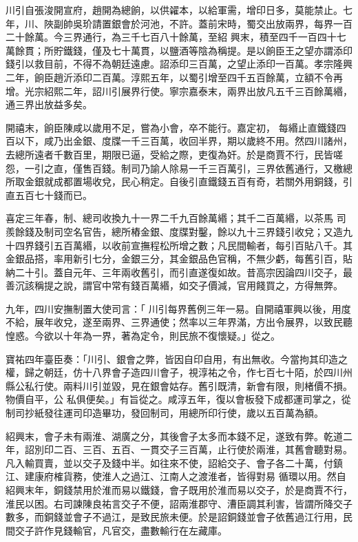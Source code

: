 \begin{pinyinscope}
 川引自張浚開宣府，趙開為總餉，以供糴本，以給軍需，增印日多，莫能禁止。七年，川、陜副帥吳玠請置銀會於河池，不許。蓋前宋時，蜀交出放兩界，每界一百二十餘萬。今三界通行，為三千七百八十餘萬，至紹
 興末，積至四千一百四十七萬餘貫；所貯鐵錢，僅及七十萬貫，以鹽酒等陰為稱提。是以餉臣王之望亦謂添印錢引以救目前，不得不為朝廷遠慮。詔添印三百萬，之望止添印一百萬。孝宗隆興二年，餉臣趙沂添印二百萬。淳熙五年，以蜀引增至四千五百餘萬，立額不令再增。光宗紹熙二年，詔川引展界行使。寧宗嘉泰末，兩界出放凡五千三百餘萬緡，通三界出放益多矣。



 開禧末，餉臣陳咸以歲用不足，嘗為小會，卒不能行。嘉定初，
 每緡止直鐵錢四百以下，咸乃出金銀、度牒一千三百萬，收回半界，期以歲終不用。然四川諸州，去總所遠者千數百里，期限已逼，受給之際，吏復為奸。於是商賈不行，民皆嗟怨，一引之直，僅售百錢。制司乃諭人除易一千三百萬引，三界依舊通行，又檄總所取金銀就成都置場收兌，民心稍定。自後引直鐵錢五百有奇，若關外用銅錢，引直五百七十錢而已。



 喜定三年春，制、總司收換九十一界二千九百餘萬緡；其千二百萬緡，以茶馬
 司羨餘錢及制司空名官告，總所樁金銀、度牒對鑿，餘以九十三界錢引收兌；又造九十四界錢引五百萬緡，以收前宣撫程松所增之數；凡民間輸者，每引百貼八千。其金銀品搭，率用新引七分，金銀三分，其金銀品色官稱，不無少虧，每舊引百，貼納二十引。蓋自元年、三年兩收舊引，而引直遂復如故。昔高宗因論四川交子，最善沉該稱提之說，謂官中常有錢百萬緡，如交子價減，官用餞買之，方得無弊。



 九年，四川安撫制置大使司言：「
 川引每界舊例三年一易。自開禧軍興以後，用度不給，展年收兌，遂至兩界、三界通使；然率以三年界滿，方出令展界，以致民聽惶惑。今欲以十年為一界，著為定令，則民旅不復懷疑。」從之。



 寶祐四年臺臣奏：「川引、銀會之弊，皆因自印自用，有出無收。今當拘其印造之權，歸之朝廷，仿十八界會子造四川會子，視淳祐之令，作七百七十陌，於四川州縣公私行使。兩料川引並毀，見在銀會姑存。舊引既清，新會有限，則楮價不損。物價自平，公
 私俱便矣。」有旨從之。咸淳五年，復以會板發下成都運司掌之，從制司抄紙發往運司印造畢功，發回制司，用總所印行使，歲以五百萬為額。



 紹興末，會子未有兩淮、湖廣之分，其後會子太多而本錢不足，遂致有弊。乾道二年，詔別印二百、三百、五百、一貫交子三百萬，止行使於兩淮，其舊會聽對易。凡入輸買賣，並以交子及錢中半。如往來不使，詔給交子、會子各二十萬，付鎮江、建康府榷貨務，使淮人之過江、江南人之渡淮者，皆得對易
 循環以用。然自紹興末年，銅錢禁用於淮而易以鐵錢，會子既用於淮而易以交子，於是商賈不行，淮民以困。右司諫陳良祐言交子不便，詔兩淮郡守、漕臣調其利害，皆謂所降交子數多，而銅錢並會子不過江，是致民旅未便。於是詔銅錢並會子依舊過江行用，民間交子許作見錢輸官，凡官交，盡數輸行在左藏庫。




\end{pinyinscope}
